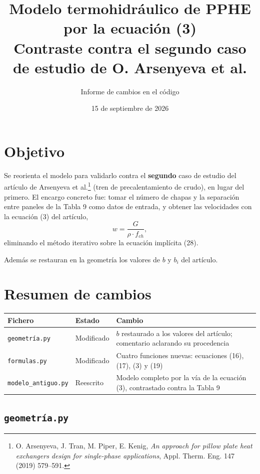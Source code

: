\documentclass[11pt,a4paper]{article}
\title{Modelo termohidráulico de PPHE por la ecuación (3)\\
       \large Contraste contra el segundo caso de estudio de O. Arsenyeva et al.}
\author{Informe de cambios en el código}
\date{15 de septiembre de 2026}
\begin{document}
\maketitle

\section{Objetivo}

Se reorienta el modelo para validarlo contra el \textbf{segundo} caso de estudio del artículo
de Arsenyeva et al.\footnote{O. Arsenyeva, J. Tran, M. Piper, E. Kenig, \emph{An approach for
pillow plate heat exchangers design for single-phase applications}, Appl. Therm. Eng. 147
(2019) 579--591.} (tren de precalentamiento de crudo), en lugar del primero. El encargo
concreto fue: tomar el número de chapas y la separación entre paneles de la Tabla 9 como datos
de entrada, y obtener las velocidades con la ecuación (3) del artículo,
\begin{equation}
  w = \frac{G}{\rho \cdot f_{ch}},
\end{equation}
eliminando el método iterativo sobre la ecuación implícita (28).

Además se restauran en la geometría los valores de $b$ y $b_i$ del artículo.

\section{Resumen de cambios}

\begin{table}[h]
\centering
\begin{tabular}{llp{8.2cm}}
\toprule
Fichero & Estado & Cambio \\
\midrule
\texttt{geometría.py}      & Modificado & $b$ restaurado a los valores del artículo; comentario aclarando su procedencia \\
\texttt{formulas.py}       & Modificado & Cuatro funciones nuevas: ecuaciones (16), (17), (3) y (19) \\
\texttt{modelo\_antiguo.py} & Reescrito  & Modelo completo por la vía de la ecuación (3), contrastado contra la Tabla 9 \\
\bottomrule
\end{tabular}
\end{table}

\subsection{\texttt{geometría.py}}
\end{document}
